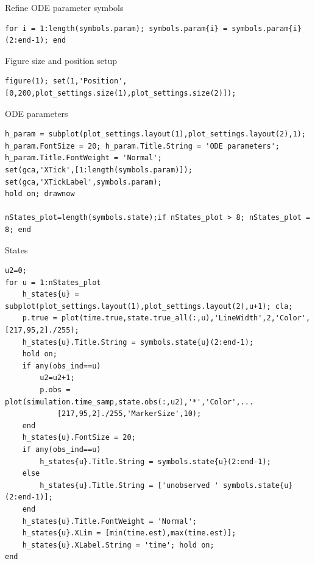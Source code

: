\color{black}
\begin{par}
Refine ODE parameter symbols
\end{par} \vspace{1em}
\color{RoyalPurple}\begin{verbatim}
for i = 1:length(symbols.param); symbols.param{i} = symbols.param{i}(2:end-1); end
\end{verbatim}
\color{black}
\begin{par}
Figure size and position setup
\end{par} \vspace{1em}
\color{RoyalPurple}\begin{verbatim}
figure(1); set(1,'Position',[0,200,plot_settings.size(1),plot_settings.size(2)]);
\end{verbatim}
\color{black}

\begin{par}
ODE parameters
\end{par} \vspace{1em}
\color{RoyalPurple}\begin{verbatim}
h_param = subplot(plot_settings.layout(1),plot_settings.layout(2),1);
h_param.FontSize = 20; h_param.Title.String = 'ODE parameters';
h_param.Title.FontWeight = 'Normal';
set(gca,'XTick',[1:length(symbols.param)]); set(gca,'XTickLabel',symbols.param);
hold on; drawnow

nStates_plot=length(symbols.state);if nStates_plot > 8; nStates_plot = 8; end
\end{verbatim}
\color{black}

\begin{par}
States
\end{par} \vspace{1em}
\color{RoyalPurple}\begin{verbatim}
u2=0;
for u = 1:nStates_plot
    h_states{u} = subplot(plot_settings.layout(1),plot_settings.layout(2),u+1); cla;
    p.true = plot(time.true,state.true_all(:,u),'LineWidth',2,'Color',[217,95,2]./255);
    h_states{u}.Title.String = symbols.state{u}(2:end-1);
    hold on;
    if any(obs_ind==u)
        u2=u2+1;
        p.obs = plot(simulation.time_samp,state.obs(:,u2),'*','Color',...
            [217,95,2]./255,'MarkerSize',10);
    end
    h_states{u}.FontSize = 20;
    if any(obs_ind==u)
        h_states{u}.Title.String = symbols.state{u}(2:end-1);
    else
        h_states{u}.Title.String = ['unobserved ' symbols.state{u}(2:end-1)];
    end
    h_states{u}.Title.FontWeight = 'Normal';
    h_states{u}.XLim = [min(time.est),max(time.est)];
    h_states{u}.XLabel.String = 'time'; hold on;
end
\end{verbatim}
\color{black}

